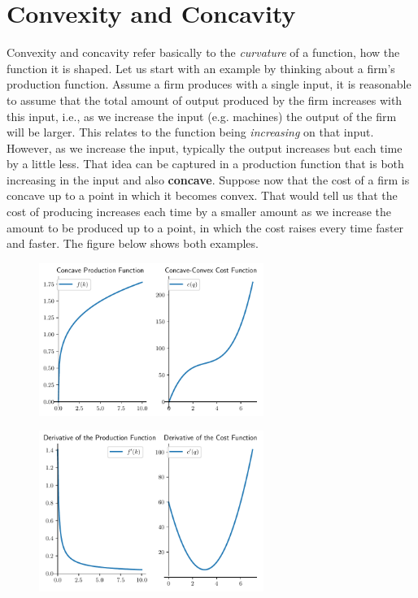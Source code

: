 \documentclass[a4paper,11pt]{article}
\theoremstyle{definition}
\theoremstyle{plain}
\begin{document}
    \section{Convexity and Concavity}\label{convexity-and-concavity}

Convexity and concavity refer basically to the \emph{curvature} of a
function, how the function it is shaped. Let us start with an example by
thinking about a firm's production function. Assume a firm produces with
a single input, it is reasonable to assume that the total amount of
output produced by the firm increases with this input, i.e., as we
increase the input (e.g. machines) the output of the firm will be
larger. This relates to the function being \emph{increasing} on that
input. However, as we increase the input, typically the output increases
but each time by a little less. That idea can be captured in a
production function that is both increasing in the input and also
\textbf{concave}. Suppose now that the cost of a firm is concave up to a
point in which it becomes convex. That would tell us that the cost of
producing increases each time by a smaller amount as we increase the
amount to be produced up to a point, in which the cost raises every time
faster and faster. The figure below shows both examples.

    \begin{figure}[htbp]
    	\centering 
    		\includegraphics[width = 0.65\textwidth]{Ch2_files/Ch2_23_0.pdf}
    \end{figure}
    
    \begin{figure}[htbp]
    	\centering 
    		\includegraphics[width = 0.65\textwidth]{Ch2_files/Ch2_23_1.pdf}
    \end{figure}
    
\end{document}
